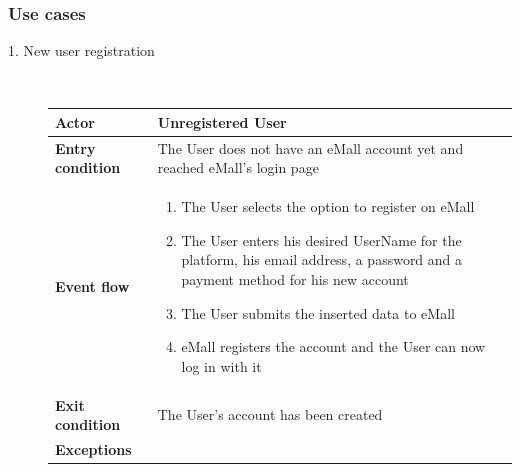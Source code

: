 \documentclass[11pt]{article}
\begin{document}
\newpage

\subsubsection{Use cases}

\begin{description}
    \item [1. New user registration] \hfill \\
    \begin{table}[H]
        \centering
        \setlength{\tabcolsep}{18pt}
        \renewcommand{\arraystretch}{1.4}
        \begin{tabularx}{\textwidth}{|>{\hsize=0.5\hsize}X|>{\hsize=1.5\hsize}X|}
            \hline
            \textbf{Actor} & Unregistered User \\
            \hline
            \textbf{Entry condition} & The User does not have an eMall account yet and reached eMall's login page \\
            \hline
            \textbf{Event flow} & 
                \begin{minipage}[t]{\hsize}
                \begin{enumerate}[topsep=0pt, leftmargin=*]
                    \item The User selects the option to register on eMall
                    \item The User enters his desired UserName for the platform, his email address, a password and a payment method for his new account
                    \item The User submits the inserted data to eMall
                    \item eMall registers the account and the User can now log in with it
                \end{enumerate}
                \end{minipage}
                \vspace{6pt}
            \\
            \hline
            \textbf{Exit condition} & The User's account has been created \\
            \hline
            \textbf{Exceptions} & 
                \begin{minipage}[t]{\hsize}
                \vspace{0pt}
                \begin{itemize}[topsep=0pt, leftmargin=*]

\end{itemize}
\end{minipage}
\end{tabularx}
\end{table}
\end{description}
\end{document}
